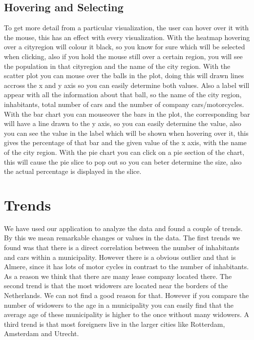 \documentclass[a4paper,twoside,11pt]{article}
\begin{document}
\subsection{Hovering and Selecting}
To get more detail from a particular visualization, the user can hover over it with the mouse, this has an effect with every visualization. \newline
With the heatmap hovering over a cityregion will colour it black, so you know for sure which will be selected when clicking, also if you hold the mouse still over a certain region, you will see the population in that cityregion and the name of the city region. \newline
With the scatter plot you can mouse over the balls in the plot, doing this will drawn lines accross the x and y axis so you can easily determine both values. Also a label will appear with all the information about that ball, so the name of the city region, inhabitants, total number of cars and the number of company cars/motorcycles. \newline
With the bar chart you can mouseover the bars in the plot, the corresponding bar will have a line drawn to the y axis, so you can easily determine the value, also you can see the value in the label which will be shown when hovering over it, this gives the percentage of that bar and the given value of the x axis, with the name of the city region. \newline
With the pie chart you can click on a pie section of the chart, this will cause the pie slice to pop out so you can beter determine the size, also the actual percentage is displayed in the slice. \newline
\newpage

\section{Trends}
We have used our application to analyze the data and found a couple of trends. By
this we mean remarkable changes or values in the data. \newline \newline
The first trends we found was that there is a direct correlation between the number of inhabitants and cars within a municipality. However there is a obvious outlier and that is Almere, since it has lots of motor cycles in contrast to the number of inhabitants. As a reason we think that there are many lease company located there. \newline \newline
The second trend is that the most widowers are located near the borders of the Netherlands. We can not find a good reason for that. However if you compare the number of widowers to the age in a municipality you can easily find that the average age of these municipality is higher to the once without many widowers. \newline \newline
A third trend is that most foreigners live in the larger cities like Rotterdam, Amsterdam and Utrecht.
\newpage
\end{document}
